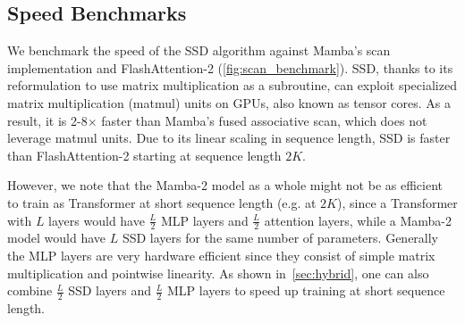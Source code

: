 \subsection{Speed Benchmarks}
\label{sec:experiments:benchmark}

We benchmark the speed of the SSD algorithm against Mamba's scan implementation and FlashAttention-2 (\cref{fig:scan_benchmark}).
SSD, thanks to its reformulation to use matrix multiplication as a subroutine, can exploit specialized matrix multiplication (matmul) units on GPUs, also known as tensor cores.
As a result, it is 2-8$\times$ faster than Mamba's fused associative scan, which does not leverage matmul units.
Due to its linear scaling in sequence length, SSD is faster than FlashAttention-2 starting at sequence length $2K$.

However, we note that the Mamba-2 model as a whole might not be as efficient to train as Transformer at short sequence length (e.g. at $2K$), since a Transformer with $L$ layers would have $\frac{L}{2}$ MLP layers and $\frac{L}{2}$ attention layers, while a Mamba-2 model would have $L$ SSD layers for the same number of parameters.
Generally the MLP layers are very hardware efficient since they consist of simple matrix multiplication and pointwise linearity.
As shown in~\cref{sec:hybrid}, one can also combine $\frac{L}{2}$ SSD layers and $\frac{L}{2}$ MLP layers to speed up training at short sequence length.

